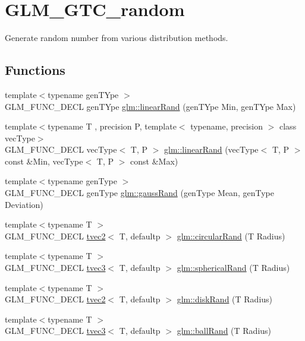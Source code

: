 \hypertarget{group__gtc__random}{}\section{G\+L\+M\+\_\+\+G\+T\+C\+\_\+random}
\label{group__gtc__random}


Generate random number from various distribution methods.  


\subsection*{Functions}
\begin{DoxyCompactItemize}
\item 
{\footnotesize template$<$typename gen\+T\+Ype $>$ }\\G\+L\+M\+\_\+\+F\+U\+N\+C\+\_\+\+D\+E\+CL gen\+T\+Ype \hyperlink{group__gtc__random_ga12aebc19b85a8c736f5801c2f7b9b716}{glm\+::linear\+Rand} (gen\+T\+Ype Min, gen\+T\+Ype Max)
\item 
{\footnotesize template$<$typename T , precision P, template$<$ typename, precision $>$ class vec\+Type$>$ }\\G\+L\+M\+\_\+\+F\+U\+N\+C\+\_\+\+D\+E\+CL vec\+Type$<$ T, P $>$ \hyperlink{group__gtc__random_gaba9cec867916d894d794a32897b7fdfd}{glm\+::linear\+Rand} (vec\+Type$<$ T, P $>$ const \&Min, vec\+Type$<$ T, P $>$ const \&Max)
\item 
{\footnotesize template$<$typename gen\+Type $>$ }\\G\+L\+M\+\_\+\+F\+U\+N\+C\+\_\+\+D\+E\+CL gen\+Type \hyperlink{group__gtc__random_ga5193a83e49e4fdc5652c084711083574}{glm\+::gauss\+Rand} (gen\+Type Mean, gen\+Type Deviation)
\item 
{\footnotesize template$<$typename T $>$ }\\G\+L\+M\+\_\+\+F\+U\+N\+C\+\_\+\+D\+E\+CL \hyperlink{structglm_1_1tvec2}{tvec2}$<$ T, defaultp $>$ \hyperlink{group__gtc__random_gae989c26a2899b2fb7444abe7c275c29c}{glm\+::circular\+Rand} (T Radius)
\item 
{\footnotesize template$<$typename T $>$ }\\G\+L\+M\+\_\+\+F\+U\+N\+C\+\_\+\+D\+E\+CL \hyperlink{structglm_1_1tvec3}{tvec3}$<$ T, defaultp $>$ \hyperlink{group__gtc__random_gaa9a6fc2d7a295b3857f7db23b1053d9d}{glm\+::spherical\+Rand} (T Radius)
\item 
{\footnotesize template$<$typename T $>$ }\\G\+L\+M\+\_\+\+F\+U\+N\+C\+\_\+\+D\+E\+CL \hyperlink{structglm_1_1tvec2}{tvec2}$<$ T, defaultp $>$ \hyperlink{group__gtc__random_gad3a3ee7d26502a31ba552cb627a68606}{glm\+::disk\+Rand} (T Radius)
\item 
{\footnotesize template$<$typename T $>$ }\\G\+L\+M\+\_\+\+F\+U\+N\+C\+\_\+\+D\+E\+CL \hyperlink{structglm_1_1tvec3}{tvec3}$<$ T, defaultp $>$ \hyperlink{group__gtc__random_ga5506dee301160e3a06aef9b9bc7a0a83}{glm\+::ball\+Rand} (T Radius)
\end{DoxyCompactItemize}


